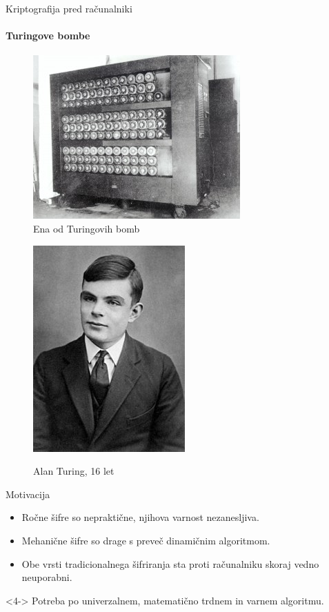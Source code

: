 \documentclass[a4paper, 12pt]{beamer} %
\begin{document}
\begin{frame}{Kriptografija pred računalniki}
\framesubtitle{Turingove bombe}
\begin{minipage}[b]{0.45\linewidth}
\begin{figure}
\centering
\includegraphics[scale=0.6]{turingbomb}
\caption{Ena od Turingovih bomb}
\label{fig:bomba}
\end{figure}
\end{minipage}
\hfill
\begin{minipage}[b]{0.45\linewidth}
\begin{figure}
\centering
\includegraphics[scale=0.5]{AlanTuring16}
\label{fig:turing}
\caption{Alan Turing, 16 let}
\end{figure}
\end{minipage}
\end{frame}

\begin{frame}{Motivacija}
\begin{itemize}[label=]
\item<1->Ročne šifre so nepraktične, njihova varnost nezanesljiva.
\item<2->Mehanične šifre so drage s preveč dinamičnim algoritmom.
\item<3->Obe vrsti tradicionalnega šifriranja sta proti računalniku skoraj vedno neuporabni.
\end{itemize}
\begin{alertblock}<4->{}
\alert{Potreba po univerzalnem, matematično trdnem in varnem algoritmu.}
\end{alertblock}
\end{frame}
\end{document}
